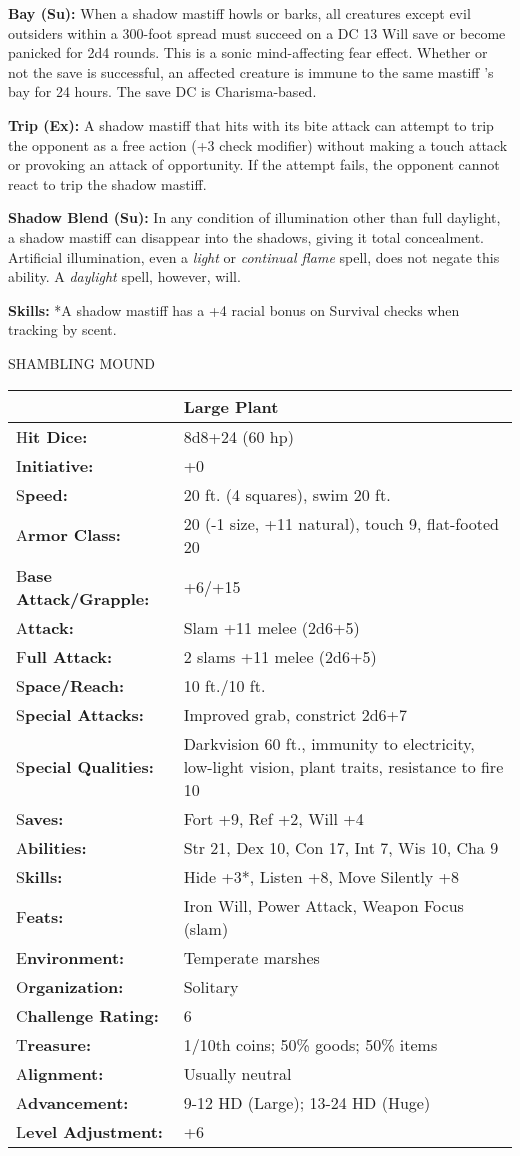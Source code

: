 \documentclass{article}
\begin{document}
\textbf{Bay (Su):} When a shadow mastiff howls or barks, all creatures except evil 
outsiders within a 300-foot spread must succeed on a DC 13 Will save or become 
panicked for 2d4 rounds. This is a sonic mind-affecting fear effect. Whether or 
not the save is successful, an affected creature is immune to the same mastiff 
's bay for 24 hours. The save DC is Charisma-based.

\textbf{Trip (Ex):} A shadow mastiff that hits with its bite attack can attempt 
to trip the opponent as a free action (+3 check modifier) without making a touch 
attack or provoking an attack of opportunity. If the attempt fails, the opponent 
cannot react to trip the shadow mastiff. 

\textbf{Shadow Blend (Su):} In any condition of illumination other than full daylight, 
a shadow mastiff can disappear into the shadows, giving it total concealment. Artificial 
illumination, even a \textit{light }or \textit{continual flame }spell, does not 
negate this ability. A \textit{daylight }spell, however, will.

\textbf{Skills: }*A shadow mastiff has a +4 racial bonus on Survival checks when 
tracking by scent.

\vspace{12pt}
{\LARGE{}SHAMBLING MOUND}

\begin{tabular}{|>{\raggedright}p{91pt}|>{\raggedright}p{213pt}|}
\hline
  & Large Plant\tabularnewline
\hline
H\textbf{it Dice:} & 8d8+24 (60 hp)\tabularnewline
\hline
I\textbf{nitiative:} & +0\tabularnewline
\hline
S\textbf{peed:} & 20 ft. (4 squares), swim 20 ft.\tabularnewline
\hline
A\textbf{rmor Class:} & 20 (-1 size, +11 natural), touch 9, flat-footed 20\tabularnewline
\hline
B\textbf{ase Attack/Grapple:} & +6/+15\tabularnewline
\hline
A\textbf{ttack:} & Slam +11 melee (2d6+5)\tabularnewline
\hline
F\textbf{ull Attack:} & 2 slams +11 melee (2d6+5)\tabularnewline
\hline
S\textbf{pace/Reach:} & 10 ft./10 ft.\tabularnewline
\hline
S\textbf{pecial Attacks:} & Improved grab, constrict 2d6+7\tabularnewline
\hline
S\textbf{pecial Qualities:} & Darkvision 60 ft., immunity to electricity, low-light 
vision, plant traits, resistance to fire 10\tabularnewline
\hline
S\textbf{aves:} & Fort +9, Ref +2, Will +4\tabularnewline
\hline
A\textbf{bilities:} & Str 21, Dex 10, Con 17, Int 7, Wis 10, Cha 9\tabularnewline
\hline
S\textbf{kills:} & Hide +3*, Listen +8, Move Silently +8\tabularnewline
\hline
F\textbf{eats:} & Iron Will, Power Attack, Weapon Focus (slam)\tabularnewline
\hline
E\textbf{nvironment:} & Temperate marshes\tabularnewline
\hline
O\textbf{rganization:} & Solitary\tabularnewline
\hline
C\textbf{hallenge Rating:} & 6\tabularnewline
\hline
T\textbf{reasure:} & 1/10th coins; 50\% goods; 50\% items\tabularnewline
\hline
A\textbf{lignment:} & Usually neutral\tabularnewline
\hline
A\textbf{dvancement:} & 9-12 HD (Large); 13-24 HD (Huge)\tabularnewline
\hline
L\textbf{evel Adjustment:} & +6\tabularnewline
\hline
\end{tabular}
\end{document}
